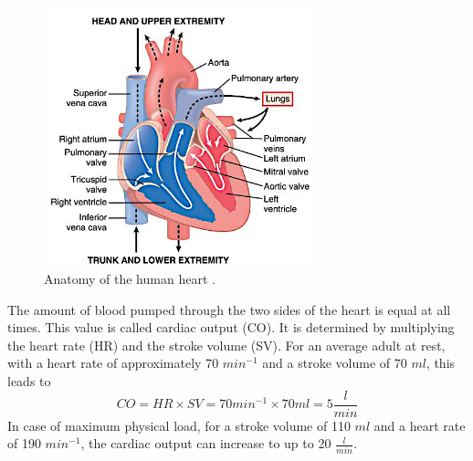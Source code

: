  \begin{figure}[h]
   \centering
   \includegraphics[width=0.7\textwidth]{images/heart_1.jpg}
   \caption[Anatomy of the human heart]{Anatomy of the human heart \cite{GH20}.}
   \label{fig:heart_anat}
 \end{figure}
 The amount of blood pumped through the two sides of the heart is equal at all times. This value is called cardiac output (CO). It is determined by multiplying the heart rate (HR) and the stroke volume (SV). For an average adult at rest, with a heart rate of approximately 70 $min^{-1}$ and a stroke volume of 70 $ml$, this leads to
 \begin{equation}
   CO = HR \times SV = 70 min^{-1} \times 70 ml = 5 \frac{l}{min}
  \label{eq:CO}
 \end{equation}
In case of maximum physical load, for a stroke volume of 110 $ml$ and a heart rate of 190 $min^{-1}$,  the cardiac output can increase to up to 20 $\frac{l}{min}$. \cite{HKS4}

